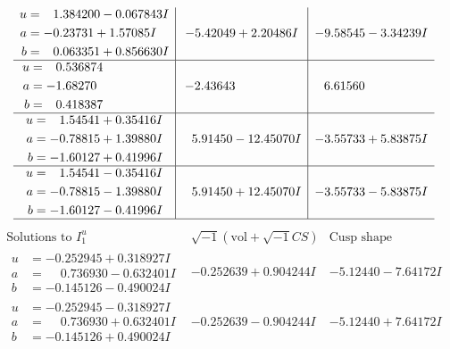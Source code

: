 \documentclass[1p]{elsarticle_modified}
\theoremstyle{definition}
\newcommand{\I}{\sqrt{-1}}
\begin{document}
$$\begin{array}{c|c|c}
\begin{aligned}
u &= \phantom{-}1.384200 - 0.067843 I \\
a &= -0.23731 + 1.57085 I \\
b &= \phantom{-}0.063351 + 0.856630 I\end{aligned}
 & -5.42049 + 2.20486 I & -9.58545 - 3.34239 I \\ \hline\begin{aligned}
u &= \phantom{-}0.536874\phantom{ +0.000000I} \\
a &= -1.68270\phantom{ +0.000000I} \\
b &= \phantom{-}0.418387\phantom{ +0.000000I}\end{aligned}
 & -2.43643\phantom{ +0.000000I} & \phantom{-}6.61560\phantom{ +0.000000I} \\ \hline\begin{aligned}
u &= \phantom{-}1.54541 + 0.35416 I \\
a &= -0.78815 + 1.39880 I \\
b &= -1.60127 + 0.41996 I\end{aligned}
 & \phantom{-}5.91450 - 12.45070 I & -3.55733 + 5.83875 I \\ \hline\begin{aligned}
u &= \phantom{-}1.54541 - 0.35416 I \\
a &= -0.78815 - 1.39880 I \\
b &= -1.60127 - 0.41996 I\end{aligned}
 & \phantom{-}5.91450 + 12.45070 I & -3.55733 - 5.83875 I\\
 \hline 
 \end{array}$$\newpage$$\begin{array}{c|c|c}  
\text{Solutions to }I^u_{1}& \I (\text{vol} + \sqrt{-1}CS) & \text{Cusp shape}\\
 \hline 
\begin{aligned}
u &= -0.252945 + 0.318927 I \\
a &= \phantom{-}0.736930 - 0.632401 I \\
b &= -0.145126 - 0.490024 I\end{aligned}
 & -0.252639 + 0.904244 I & -5.12440 - 7.64172 I \\ \hline\begin{aligned}
u &= -0.252945 - 0.318927 I \\
a &= \phantom{-}0.736930 + 0.632401 I \\
b &= -0.145126 + 0.490024 I\end{aligned}
 & -0.252639 - 0.904244 I & -5.12440 + 7.64172 I \\ \hline\begin{aligned}

\end{aligned}
\end{array}$$
\end{document}

